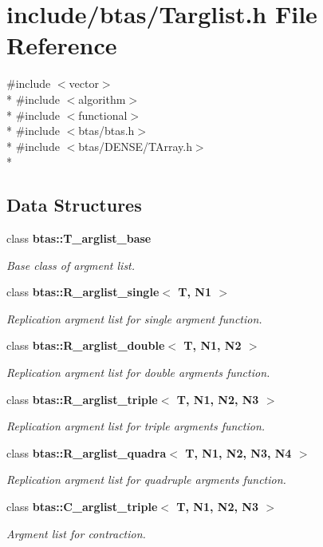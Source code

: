 \section{include/btas/\-Targlist.h File Reference}
\label{d6/d01/Targlist_8h}
{\ttfamily \#include $<$vector$>$}\\*
{\ttfamily \#include $<$algorithm$>$}\\*
{\ttfamily \#include $<$functional$>$}\\*
{\ttfamily \#include $<$btas/btas.\-h$>$}\\*
{\ttfamily \#include $<$btas/\-D\-E\-N\-S\-E/\-T\-Array.\-h$>$}\\*
\subsection*{Data Structures}
\begin{DoxyCompactItemize}
\item 
class {\bf btas\-::\-T\-\_\-arglist\-\_\-base}
\begin{DoxyCompactList}\small\item\em Base class of argment list. \end{DoxyCompactList}\item 
class {\bf btas\-::\-R\-\_\-arglist\-\_\-single$<$ T, N1 $>$}
\begin{DoxyCompactList}\small\item\em Replication argment list for single argment function. \end{DoxyCompactList}\item 
class {\bf btas\-::\-R\-\_\-arglist\-\_\-double$<$ T, N1, N2 $>$}
\begin{DoxyCompactList}\small\item\em Replication argment list for double argments function. \end{DoxyCompactList}\item 
class {\bf btas\-::\-R\-\_\-arglist\-\_\-triple$<$ T, N1, N2, N3 $>$}
\begin{DoxyCompactList}\small\item\em Replication argment list for triple argments function. \end{DoxyCompactList}\item 
class {\bf btas\-::\-R\-\_\-arglist\-\_\-quadra$<$ T, N1, N2, N3, N4 $>$}
\begin{DoxyCompactList}\small\item\em Replication argment list for quadruple argments function. \end{DoxyCompactList}\item 
class {\bf btas\-::\-C\-\_\-arglist\-\_\-triple$<$ T, N1, N2, N3 $>$}
\begin{DoxyCompactList}\small\item\em Argment list for contraction. \end{DoxyCompactList}\end{DoxyCompactItemize}
